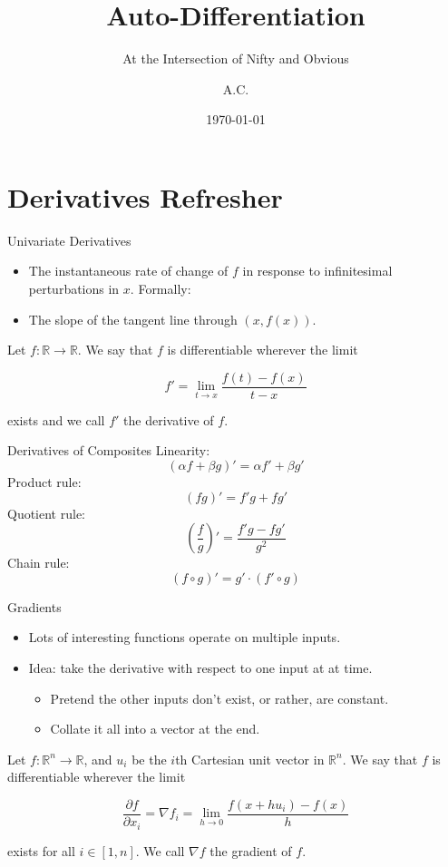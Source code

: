 \documentclass[pdf]{beamer}
\title{Auto-Differentiation}
\subtitle{At the Intersection of Nifty and Obvious}
\author{A.C.}
\date{\today}
\begin{document}
\begin{frame}
  \titlepage
\end{frame}

\section{Derivatives Refresher}
\begin{frame}{Univariate Derivatives}
  \begin{itemize}
  \item The instantaneous rate of change of $f$ in response to infinitesimal
    perturbations in $x$. Formally:
  \item The slope of the tangent line through $(x,f(x))$.
  \end{itemize}
  \begin{definition}
    Let $f:\mathbb{R}\rightarrow\mathbb{R}$. We say that $f$ is differentiable
    wherever the limit

    \[ f' = \lim_{t \rightarrow x} \frac{f(t)-f(x)}{t-x} \]

    exists and we call $f'$ the derivative of $f$.
  \end{definition}
\end{frame}

\begin{frame}{Derivatives of Composites}
  Linearity: \[(\alpha f+ \beta g)' = \alpha f' + \beta g'\]
  Product rule: \[(fg)' = f'g + fg'\]
  Quotient rule: \[\left(\frac{f}{g}\right)' = \frac{f'g - fg'}{g^2}\]
  Chain rule: \[(f \circ g)' = g' \cdot (f' \circ g)\]
\end{frame}

\begin{frame}{Gradients}
  \begin{itemize}
  \item Lots of interesting functions operate on multiple inputs.
  \item Idea: take the derivative with respect to one input at at time.
    \begin{itemize}
    \item Pretend the other inputs don't exist, or rather, are constant.
    \item Collate it all into a vector at the end.
    \end{itemize}
  \end{itemize}
  \begin{definition}
    Let $f:\mathbb{R}^n\rightarrow\mathbb{R}$, and $u_i$ be the $i$th Cartesian
    unit vector in $\mathbb{R}^n$. We say that $f$ is differentiable wherever
    the limit

    \[ \frac{\partial f}{\partial x_i} = {\nabla f}_i = \lim_{h \rightarrow 0} \frac{f(x + hu_i)-f(x)}{h} \]

    exists for all $i \in [1,n]$. We call $\nabla f$ the gradient of $f$.
  \end{definition}
\end{frame}
\end{document}
